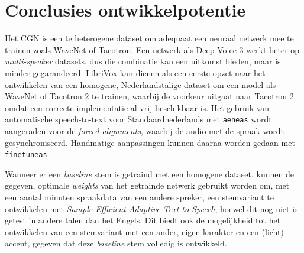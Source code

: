
\section{Conclusies ontwikkelpotentie}

Het CGN is een te heterogene dataset om adequaat een neuraal netwerk mee te trainen zoals WaveNet of Tacotron. Een netwerk als Deep Voice 3 werkt beter op \textit{multi-speaker} datasets, dus die combinatie kan een uitkomst bieden, maar is minder gegarandeerd. LibriVox kan dienen als een eerste opzet naar het ontwikkelen van een homogene, Nederlandstalige dataset om een model als WaveNet of Tacotron 2 te trainen, waarbij de voorkeur uitgaat naar Tacotron 2 omdat een correcte implementatie al vrij beschikbaar is. Het gebruik van automatische speech-to-text voor Standaardnederlands met \texttt{aeneas} wordt aangeraden voor de \textit{forced alignments}, waarbij de audio met de spraak wordt gesynchroniseerd. Handmatige aanpassingen kunnen daarna worden gedaan met \texttt{finetuneas}.

Wanneer er een \textit{baseline} stem is getraind met een homogene dataset, kunnen de gegeven, optimale \textit{weights} van het getrainde netwerk gebruikt worden om, met een aantal minuten spraakdata van een andere spreker, een stemvariant te ontwikkelen met \textit{Sample Efficient Adaptive Text-to-Speech}, hoewel dit nog niet is getest in andere talen dan het Engels. Dit biedt ook de mogelijkheid tot het ontwikkelen van een stemvariant met een ander, eigen karakter en een (licht) accent, gegeven dat deze \textit{baseline} stem volledig is ontwikkeld.